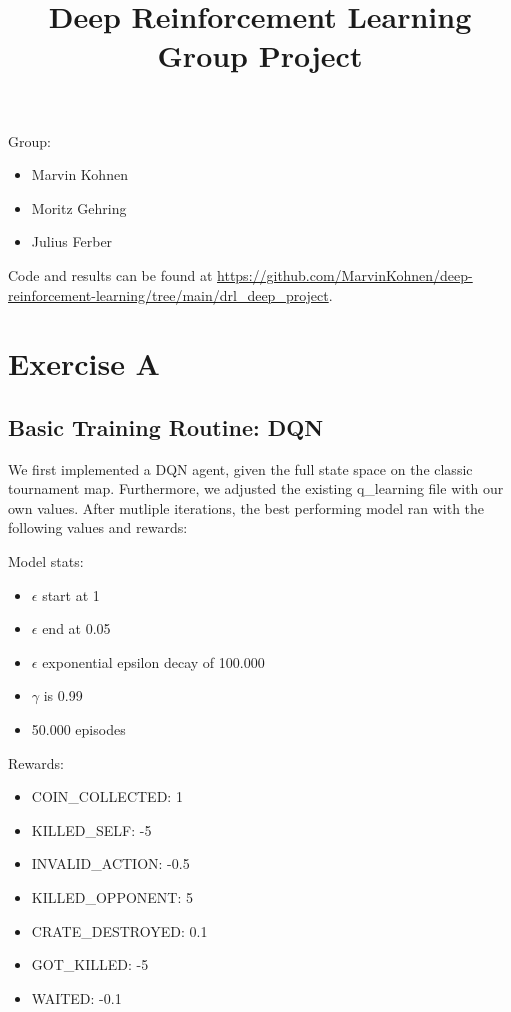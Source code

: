 \documentclass{article} %
\begin{document}
	
	\title{Deep Reinforcement Learning Group Project}
	\maketitle
	
	Group:
	\begin{itemize}
		\item Marvin Kohnen
		\item Moritz Gehring
		\item Julius Ferber 
		
	\end{itemize}
	
	Code and results can be found at \url{https://github.com/MarvinKohnen/deep-reinforcement-learning/tree/main/drl_deep_project}.
	\section{Exercise A}
	
	\subsection{Basic Training Routine: DQN} 
	We first implemented a DQN agent, given the full state space on the classic tournament map. Furthermore, we adjusted the existing q\_learning file with our own values. After mutliple iterations, the best performing model ran with the following values and rewards: \newline

	Model stats: 
	\begin{itemize}
		\item $\epsilon$ start at 1
		\item $\epsilon$ end at 0.05
		\item $\epsilon$ exponential epsilon decay of 100.000 
		\item $\gamma$ is 0.99
		\item 50.000 episodes
	\end{itemize}
	
	Rewards:
	\begin{itemize}
		\item  COIN\_COLLECTED: 1
		\item KILLED\_SELF: -5
		\item INVALID\_ACTION: -0.5
		\item KILLED\_OPPONENT: 5
		\item CRATE\_DESTROYED: 0.1
		\item GOT\_KILLED: -5
		\item WAITED: -0.1
	\end{itemize}
		
\end{document}
